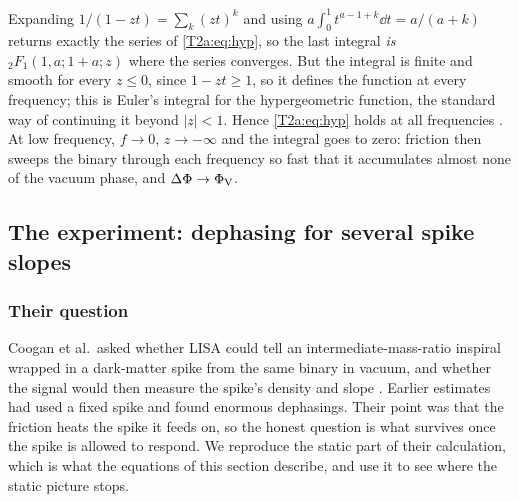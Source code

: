 Expanding $1/(1-zt)=\sum_k(zt)^k$ and using $a\int_0^1t^{a-1+k}\dd t=a/(a+k)$ returns exactly the series of \eqref{T2a:eq:hyp}, so the last integral \emph{is} ${}_2F_1(1,a;1+a;z)$ where the series converges. But the integral is finite and smooth for every $z\le0$, since $1-zt\ge1$, so it defines the function at every frequency; this is Euler's integral for the hypergeometric function, the standard way of continuing it beyond $\lvert z\rvert<1$. Hence \eqref{T2a:eq:hyp} holds at all frequencies \cite[eq.~(12)]{Coogan2022}. At low frequency, $f\to0$, $z\to-\infty$ and the integral goes to zero: friction then sweeps the binary through each frequency so fast that it accumulates almost none of the vacuum phase, and $\Delta\Phi\to\Phi_{\rm V}$.

\subsection{The experiment: dephasing for several spike slopes}
\label{T2a:sec:coogan}

\subsubsection*{Their question}
Coogan et al.\ asked whether LISA could tell an intermediate-mass-ratio inspiral wrapped in a dark-matter spike from the same binary in vacuum, and whether the signal would then measure the spike's density and slope \cite{Coogan2022}. Earlier estimates had used a fixed spike and found enormous dephasings. Their point was that the friction heats the spike it feeds on, so the honest question is what survives once the spike is allowed to respond. We reproduce the static part of their calculation, which is what the equations of this section describe, and use it to see where the static picture stops.

